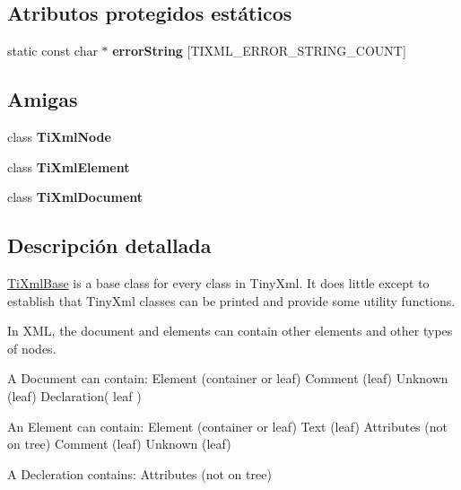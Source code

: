 \subsection*{Atributos protegidos estáticos}
\begin{DoxyCompactItemize}
\item 
static const char $\ast$ {\bfseries error\-String} \mbox{[}T\-I\-X\-M\-L\-\_\-\-E\-R\-R\-O\-R\-\_\-\-S\-T\-R\-I\-N\-G\-\_\-\-C\-O\-U\-N\-T\mbox{]}
\end{DoxyCompactItemize}
\subsection*{Amigas}
\begin{DoxyCompactItemize}
\item 
\hypertarget{class_ti_xml_base_a218872a0d985ae30e78c55adc4bdb196}{class {\bfseries Ti\-Xml\-Node}}\label{class_ti_xml_base_a218872a0d985ae30e78c55adc4bdb196}

\item 
\hypertarget{class_ti_xml_base_ab6592e32cb9132be517cc12a70564c4b}{class {\bfseries Ti\-Xml\-Element}}\label{class_ti_xml_base_ab6592e32cb9132be517cc12a70564c4b}

\item 
\hypertarget{class_ti_xml_base_a173617f6dfe902cf484ce5552b950475}{class {\bfseries Ti\-Xml\-Document}}\label{class_ti_xml_base_a173617f6dfe902cf484ce5552b950475}

\end{DoxyCompactItemize}


\subsection{Descripción detallada}
\hyperlink{class_ti_xml_base}{Ti\-Xml\-Base} is a base class for every class in Tiny\-Xml. It does little except to establish that Tiny\-Xml classes can be printed and provide some utility functions.

In X\-M\-L, the document and elements can contain other elements and other types of nodes.

\begin{DoxyVerb}A Document can contain: Element (container or leaf)
                        Comment (leaf)
                        Unknown (leaf)
                        Declaration( leaf )

An Element can contain: Element (container or leaf)
                        Text    (leaf)
                        Attributes (not on tree)
                        Comment (leaf)
                        Unknown (leaf)

A Decleration contains: Attributes (not on tree)
\end{DoxyVerb}
 

